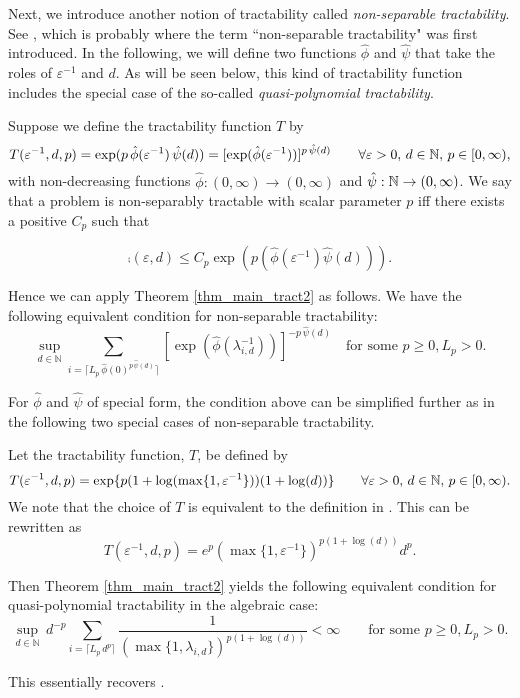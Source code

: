 \documentclass[sort&compress]{elsarticle}
\begin{document}
Next, we introduce another notion of tractability called \emph{non-separable tractability}. See \cite{GW08}, which is probably where the term ``non-separable tractability" was first introduced.
In the following, we will define two functions $\hat{\phi}$ and $\hat{\psi}$ that take the roles of $\varepsilon^{-1}$ and $d$. As will be seen below, this kind of tractability function includes the special case of the so-called \emph{quasi-polynomial tractability}.
\
\begin{example}
    Suppose we define the tractability function $T$ by
\[
 T(\varepsilon^{-1},d,p)= \exp (p \, \hat{\phi}(\varepsilon^{-1})\, \hat{\psi}(d)) = [\exp( \hat{\phi}(\varepsilon^{-1}))]^{p \, \hat{\psi}(d)}
 \qquad \forall \varepsilon > 0, \,  d \in \mathbb{N}, \, p\in [0,\infty),
\]  with non-decreasing functions $\hat{\phi} : (0,\infty) \to (0,\infty)$ and $\hat{\psi} : \mathbb{N} \to (0,\infty)$.
We say that a problem is non-separably tractable with scalar parameter $p$ iff there exists a positive $C_{p}$ such that

\[\comp(\varepsilon,d)
\leq  C_{p}\exp (p(\hat{\phi}(\varepsilon^{-1})\hat{\psi}(d))).\]

Hence we can apply Theorem \ref{thm_main_tract2} as follows. We have the following equivalent condition for non-separable tractability:
\[
\sup_{d\in\mathbb{N}}\sum_{i=\lceil L_p\,\hat{\phi}(0)^{p \, \hat{\psi}(d)}\rceil} [\exp ( \hat{\phi}(\lambda_{i,d}^{-1}))]^{-p \, \hat{\psi}(d)}\quad \text{for some } p \geq 0, L_p >0.
\]

\end{example}
For $\hat{\phi}$ and $\hat{\psi}$ of special form, the condition above can be simplified further as in the following two special cases of non-separable tractability.


\begin{example}
Let the tractability function, $T$,
be defined by
\[
 T(\varepsilon^{-1},d,p)= \exp\{ p(1+\log(\max\{1,\varepsilon^{-1}\}))(1+\log (d))\}  \qquad \forall \varepsilon > 0, \,  d \in \mathbb{N}, \, p \in [0,\infty).
\] We note that the choice of $T$ is equivalent to the definition in \cite{GneWoz11a}. This can be rewritten as
\[
T(\varepsilon^{-1},d,p) = e^p(\max\{1,\varepsilon^{-1}\})^{p(1+\log (d))}d^p.
\]

Then Theorem \ref{thm_main_tract2} yields the following equivalent condition for quasi-polynomial tractability in the algebraic case:
\[
\sup_{d\in\mathbb{N}}\,d^{-p}\sum_{i=\lceil L_p\,d^{p}\rceil} \frac{1}{\left(\max\{1,\lambda_{i,d}\}\right)^{p(1+\log (d))}} < \infty \qquad \text{for some } p \geq 0, L_p >0.\]
\end{example}
This essentially recovers \cite[Theorem 23.1]{NovWoz12a}.
\end{document}
